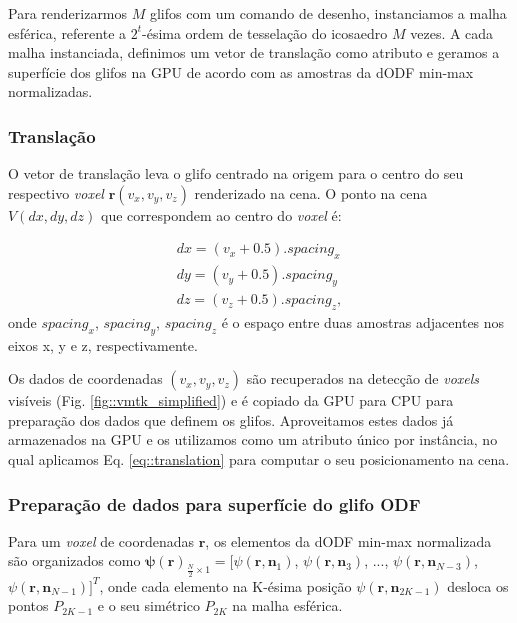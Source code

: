 Para renderizarmos $M$ glifos com um comando de desenho, instanciamos a malha esférica, referente a $2^t$-ésima ordem de tesselação do icosaedro $M$ vezes. A cada malha instanciada, definimos um vetor de translação como atributo e geramos a superfície dos glifos na GPU de acordo com as amostras da dODF min-max normalizadas.

\subsubsection{Translação}
\label{ssec::translacao}

O vetor de translação leva o glifo centrado na origem para o centro do seu respectivo \textit{voxel} $\mathbf{r}(v_x, v_y, v_z)$ renderizado na cena. O ponto na cena $V(dx, dy, dz)$ que correspondem ao centro do \textit{voxel} é:

\begin{align}
 \label{eq::translation}
    dx = (v_x + 0.5).spacing_x \nonumber\\
    dy = (v_y + 0.5).spacing_y \\
    dz = (v_z + 0.5).spacing_z \nonumber,
\end{align}
onde $spacing_x$, $spacing_y$, $spacing_z$ é o espaço entre duas amostras adjacentes nos eixos x, y e z, respectivamente.

Os dados de coordenadas $(v_x, v_y, v_z)$ são recuperados na detecção de \textit{voxels} visíveis (Fig. \ref{fig::vmtk_simplified}) e é copiado da GPU para CPU para preparação dos dados que definem os glifos. Aproveitamos estes dados já armazenados na GPU e os utilizamos como um atributo único por instância, no qual aplicamos Eq. \ref{eq::translation} para computar o seu posicionamento na cena. %

\subsubsection{Preparação de dados para superfície do glifo ODF}
\label{ssec::preparacao_de_dados}

Para um \textit{voxel} de coordenadas $\mathbf{r}$, os elementos da dODF min-max normalizada são organizados como $\boldsymbol{\psi}(\mathbf{r})_{\frac{N}{2} \times 1} = [
\psi(\mathbf{r}, \mathbf{n}_1)$,
$\psi(\mathbf{r}, \mathbf{n}_3)$, ...,
$\psi(\mathbf{r}, \mathbf{n}_{N-3})$,
$\psi(\mathbf{r}, \mathbf{n}_{N-1})]^T$, onde cada elemento na K-ésima posição $\psi(\mathbf{r}, \mathbf{n}_{2K-1})$ desloca os pontos $P_{2K-1}$ e o seu simétrico $P_{2K}$ na malha esférica.

